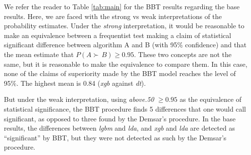 \documentclass[twoside,11pt,preprint]{article}
\begin{document}
\begin{figure}
\begin{floatrow}
\end{floatrow}
\end{figure}

We refer the reader to Table \ref{tab:main} for the BBT results regarding the base results. Here, we are faced with the strong vs weak interpretations of the probability estimates. Under the \emph{strong} interpretation, it would be reasonable to make an equivalence between a frequentist test making a claim of statistical significant difference between algorithm A and B (with 95\% confidence) and that the mean estimate that \(P(A \succ\,B) \ge 0.95\). These two concepts are not the same, but it is reasonable to make the equivalence to compare them. In this case, none of the claims of superiority made by the BBT model reaches the level of 95\%. The highest mean is 0.84 (\emph{xgb} against \emph{dt}).

But under the weak interpretation, using {\em above.50} \(\ge 0.95\) as the equivalence of statistical significance, the BBT procedure finds 5 differences that one would call significant, as opposed to three found by the Demsar's procedure.
In the base results, the differences between \emph{lgbm} and \emph{lda}, and \emph{xgb} and \emph{lda} are detected as ``significant'' by BBT, but they were not detected as such by the Demsar's procedure.
\end{document}
